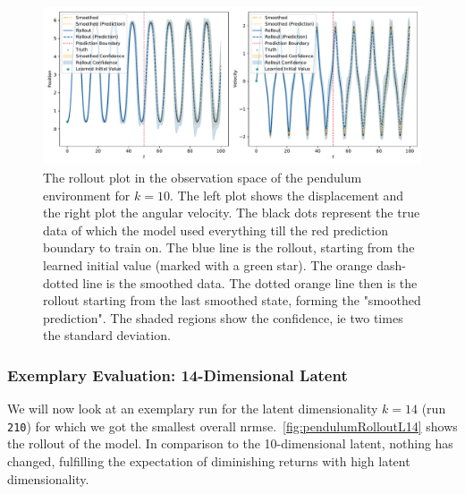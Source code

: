 			\begin{figure}
				\centering
				\includegraphics[width=\linewidth]{figures/results/pendulum/run-latent-dim-10/rollout-observations-N0.pdf}
				\caption{The rollout plot in the observation space of the pendulum environment for \(k = 10\). The left plot shows the displacement and the right plot the angular velocity. The black dots represent the true data of which the model used everything till the red prediction boundary to train on. The blue line is the rollout, starting from the learned initial value (marked with a green star). The orange dash-dotted line is the smoothed data. The dotted orange line then is the rollout starting from the last smoothed state, forming the "smoothed prediction". The shaded regions show the confidence, \ac{ie} two times the standard deviation.}
				\label{fig:pendulumRolloutL10}
			\end{figure}

		\subsubsection{Exemplary Evaluation: 14-Dimensional Latent}
			\label{subsubsec:pendulumL14}

			We will now look at an exemplary run for the latent dimensionality \( k = 14 \) (run \texttt{210}) for which we got the smallest overall \ac{nrmse}.~\autoref{fig:pendulumRolloutL14} shows the rollout of the model. In comparison to the 10-dimensional latent, nothing has changed, fulfilling the expectation of diminishing returns with high latent dimensionality.

